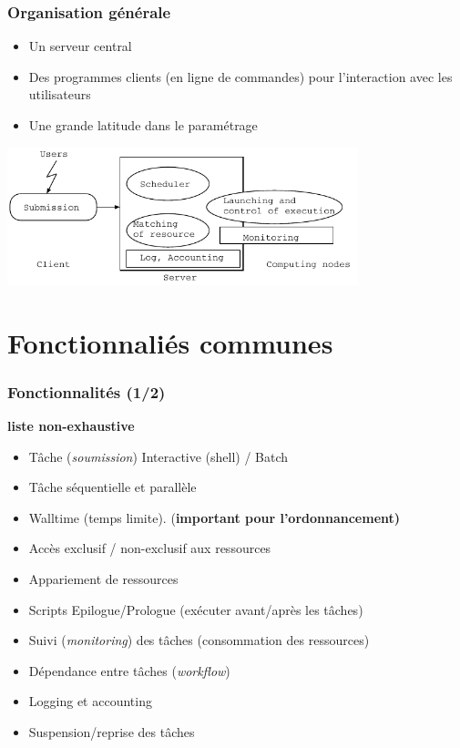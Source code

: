 \documentclass{beamer}
\begin{document}
\begin{frame}
	\frametitle{Organisation générale}

	\begin{itemize}
		\item Un serveur central
		\item Des programmes clients (en ligne de commandes) pour l'interaction avec les utilisateurs
		\item Une grande latitude dans le paramétrage
	\end{itemize}

	\begin{center}
		\includegraphics[height=4cm]{Batch_organization.pdf}
	\end{center}

\end{frame}

\section{Fonctionnaliés communes}

\begin{frame}
\frametitle{Fonctionnalités (1/2)}
	{\bf liste non-exhaustive}
		\begin{itemize}
		\item Tâche ({\em soumission}) Interactive (shell) / Batch
		\item Tâche séquentielle et parallèle
		\item Walltime (temps limite). ({\bf important pour l'ordonnancement)}
		\item Accès exclusif / non-exclusif aux ressources 
		\item Appariement de ressources
		\item Scripts Epilogue/Prologue (exécuter avant/après les tâches)
		\item Suivi ({\em monitoring}) des tâches (consommation des ressources)
		\item Dépendance entre tâches ({\em workflow})
		\item Logging et accounting
		\item Suspension/reprise des tâches 
	\end{itemize}
\end{frame}
\end{document}
